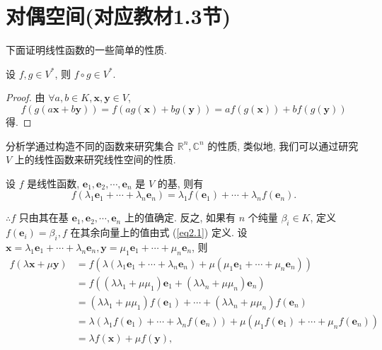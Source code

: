 \documentclass[color=black,device=normal,lang=cn,mode=geye]{elegantnote}
\begin{document}
\section{对偶空间(对应教材1.3节)}
下面证明线性函数的一些简单的性质.
\begin{property}\label{p2.1}
    设 $f,g\in V^*$, 则 $f\circ g\in V^*$.
\end{property}
\begin{proof}
    由 $\forall a,b\in K,\boldsymbol{x},\boldsymbol{y}\in V$,
    \[f(g(a\boldsymbol{x}+b\boldsymbol{y}))=f(ag(\boldsymbol{x})+bg(\boldsymbol{y}))=af(g(\boldsymbol{x}))+bf(g(\boldsymbol{y}))\]
    得.
\end{proof}

分析学通过构造不同的函数来研究集合 $\mathbb{R}^n,\mathbb{C}^n$ 的性质, 类似地, 我们可以通过研究 $V$ 上的线性函数来研究线性空间的性质.

设 $f$ 是线性函数, $\boldsymbol{e}_1,\boldsymbol{e}_2,\cdots,\boldsymbol{e}_n$ 是 $V$ 的基, 则有
\begin{equation}\label{eq2.1}
    f(\lambda_1\boldsymbol{e}_1+\cdots+\lambda_n\boldsymbol{e}_n)=\lambda_1f(\boldsymbol{e}_1)+\cdots+\lambda_nf(\boldsymbol{e}_n).
\end{equation}

$\therefore f$ 只由其在基 $\boldsymbol{e}_1,\boldsymbol{e}_2,\cdots,\boldsymbol{e}_n$ 上的值确定. 反之, 如果有 $n$ 个纯量 $\beta_i\in K$, 定义 $f(\boldsymbol{e}_i)=\beta_i,f$ 在其余向量上的值由式 (\ref{eq2.1}) 定义. 设 $\boldsymbol{x}=\lambda_1\boldsymbol{e}_1+\cdots+\lambda_n\boldsymbol{e}_n,\boldsymbol{y}=\mu_1\boldsymbol{e}_1+\cdots+\mu_n\boldsymbol{e}_n$, 则
\begin{align*}
    f(\lambda\boldsymbol{x}+\mu\boldsymbol{y}) & =f(\lambda(\lambda_1\boldsymbol{e}_1+\cdots+\lambda_n\boldsymbol{e}_n)+\mu(\mu_1\boldsymbol{e}_1+\cdots+\mu_n\boldsymbol{e}_n)) \\
    & =f((\lambda\lambda_1+\mu\mu_1)\boldsymbol{e}_1+(\lambda\lambda_n+\mu\mu_n)\boldsymbol{e}_n) \\
    & =(\lambda\lambda_1+\mu\mu_1)f(\boldsymbol{e}_1)+\cdots+(\lambda\lambda_n+\mu\mu_n)f(\boldsymbol{e}_n) \\
    & =\lambda(\lambda_1f(\boldsymbol{e}_1)+\cdots+\lambda_nf(\boldsymbol{e}_n))+\mu(\mu_1f(\boldsymbol{e}_1)+\cdots+\mu_nf(\boldsymbol{e}_n)) \\
    & =\lambda f(\boldsymbol{x})+\mu f(\boldsymbol{y}),
\end{align*}
\end{document}
